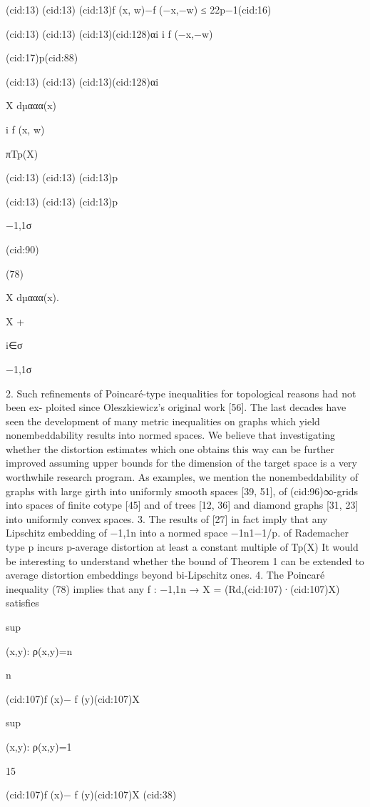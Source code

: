 {(cid:13)
(cid:13)
(cid:13)f (x, w)−f (−x,−w)
≤ 22p−1(cid:16)

(cid:13)
(cid:13)
(cid:13)(cid:128)αi
i f (−x,−w)

(cid:17)p(cid:88)

(cid:13)
(cid:13)
(cid:13)(cid:128)αi

X dµααα(x)

i f (x, w)

πTp(X)

(cid:13)
(cid:13)
(cid:13)p

(cid:13)
(cid:13)
(cid:13)p

{−1,1}σ

(cid:90)

(78)

X dµααα(x).

X +

i∈σ

{−1,1}σ

2. Such reﬁnements of Poincaré-type inequalities for topological reasons had not been ex-
ploited since Oleszkiewicz’s original work [56]. The last decades have seen the development of
many metric inequalities on graphs which yield nonembeddability results into normed spaces.
We believe that investigating whether the distortion estimates which one obtains this way can
be further improved assuming upper bounds for the dimension of the target space is a very
worthwhile research program. As examples, we mention the nonembeddability of graphs with
large girth into uniformly smooth spaces [39, 51], of (cid:96)∞-grids into spaces of ﬁnite cotype [45]
and of trees [12, 36] and diamond graphs [31, 23] into uniformly convex spaces.
3. The results of [27] in fact imply that any Lipschitz embedding of {−1,1}n into a normed space
−1n1−1/p.
of Rademacher type p incurs p-average distortion at least a constant multiple of Tp(X)
It would be interesting to understand whether the bound of Theorem 1 can be extended to
average distortion embeddings beyond bi-Lipschitz ones.
4. The Poincaré inequality (78) implies that any f : {−1,1}n → X = (Rd,(cid:107)·(cid:107)X) satisﬁes

sup

(x,y): ρ(x,y)=n

n

(cid:107)f (x)− f (y)(cid:107)X

sup

(x,y): ρ(x,y)=1

15

(cid:107)f (x)− f (y)(cid:107)X (cid:38)

}
